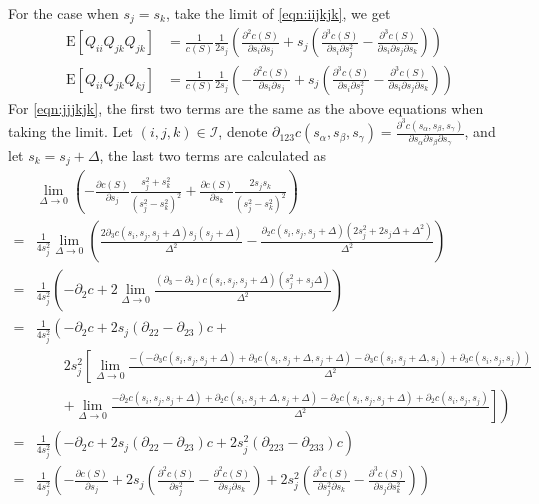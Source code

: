 \documentclass[10pt]{article}
\newcommand{\expect}[1]{\ensuremath{\mathrm{E}\left[ #1 \right]}}
\begin{document}
For the case when $s_j=s_k$, take the limit of \eqref{eqn:iijkjk}, we get
\begin{align}
	\expect{Q_{ii}Q_{jk}Q_{jk}} &= \frac{1}{c(S)}\frac{1}{2s_j} \left( \frac{\partial^2 c(S)}{\partial s_i \partial s_j} + s_j\left( \frac{\partial^3 c(S)}{\partial s_i \partial s_j^2} - \frac{\partial^3 c(S)}{\partial s_i \partial s_j \partial s_k} \right) \right) \nonumber \\
	\expect{Q_{ii}Q_{jk}Q_{kj}} &= \frac{1}{c(S)}\frac{1}{2s_j} \left( -\frac{\partial^2 c(S)}{\partial s_i \partial s_j} + s_j\left( \frac{\partial^3 c(S)}{\partial s_i \partial s_j^2} - \frac{\partial^3 c(S)}{\partial s_i \partial s_j \partial s_k} \right) \right)
\end{align}
For \eqref{eqn:jjjkjk}, the first two terms are the same as the above equations when taking the limit. Let $(i,j,k)\in\mathcal{I}$, denote $\partial_{123}c(s_\alpha,s_\beta,s_\gamma) = \frac{\partial^3 c(s_\alpha,s_\beta,s_\gamma)}{\partial s_\alpha \partial s_\beta \partial s_\gamma}$, and let $s_k=s_j+\Delta$, the last two terms are calculated as
\begin{align}
	&\lim\limits_{\Delta\to 0} \left( -\frac{\partial c(S)}{\partial s_j} \frac{s_j^2+s_k^2}{(s_j^2-s_k^2)^2} + \frac{\partial c(S)}{\partial s_k} \frac{2s_js_k}{(s_j^2-s_k^2)^2} \right) \nonumber \\
	= &\frac{1}{4s_j^2} \lim\limits_{\Delta\to 0} \left( \frac{2\partial_3 c(s_i,s_j,s_j+\Delta)s_j(s_j+\Delta)}{\Delta^2} - \frac{\partial_2 c(s_i,s_j,s_j+\Delta)(2s_j^2+2s_j\Delta+\Delta^2)}{\Delta^2} \right) \nonumber \\
	= &\frac{1}{4s_j^2} \left( -\partial_2 c + 2\lim\limits_{\Delta\to 0} \frac{(\partial_3-\partial_2) c(s_i,s_j,s_j+\Delta)(s_j^2+s_j\Delta)}{\Delta^2} \right) \nonumber \\
	= &\frac{1}{4s_j^2} \left( -\partial_2 c + 2s_j(\partial_{22}-\partial_{23})c +  \right. \nonumber \\ &\qquad \left. 2s_j^2\left[ \lim\limits_{\Delta\to 0} \frac{-\left( -\partial_3 c(s_i,s_j,s_j+\Delta) + \partial_3 c(s_i,s_j+\Delta,s_j+\Delta) - \partial_3 c(s_i,s_j+\Delta,s_j) + \partial_3 c(s_i,s_j,s_j) \right)}{\Delta^2} \right.\right. \nonumber \\ &\qquad \left.\left. +\lim\limits_{\Delta\to 0} \frac{-\partial_2 c(s_i,s_j,s_j+\Delta) + \partial_2 c(s_i,s_j+\Delta,s_j+\Delta) - \partial_2 c(s_i,s_j,s_j+\Delta) + \partial_2 c(s_i,s_j,s_j)}{\Delta^2} \right] \right) \nonumber \\
	= &\frac{1}{4s_j^2} \left( -\partial_2 c + 2s_j(\partial_{22}-\partial_{23})c + 2s_j^2(\partial_{223}-\partial_{233})c \right) \nonumber \\
	= &\frac{1}{4s_j^2} \left( -\frac{\partial c(S)}{\partial s_j} + 2s_j\left( \frac{\partial^2 c(S)}{\partial s_j^2} - \frac{\partial^2 c(S)}{\partial s_j \partial s_k} \right) + 2s_j^2\left( \frac{\partial^3 c(S)}{\partial s_j^2 \partial s_k} - \frac{\partial^3 c(S)}{\partial s_j \partial s_k^2} \right) \right)
\end{align}
\end{document}
